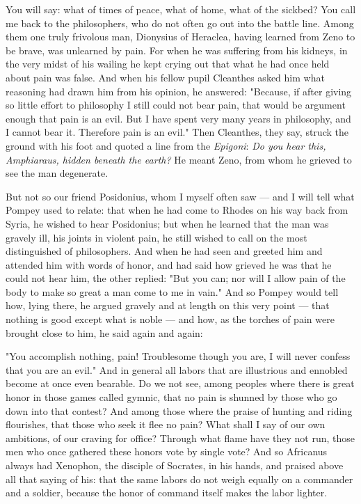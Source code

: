  You will say: what of times of peace, what of home, what of the sickbed? You call me back to the philosophers, who do not often go out into the battle line. Among them one truly frivolous man, Dionysius of Heraclea, having learned from Zeno to be brave, was unlearned by pain. For when he was suffering from his kidneys, in the very midst of his wailing he kept crying out that what he had once held about pain was false. And when his fellow pupil Cleanthes asked him what reasoning had drawn him from his opinion, he answered: "Because, if after giving so little effort to philosophy I still could not bear pain, that would be argument enough that pain is an evil. But I have spent very many years in philosophy, and I cannot bear it. Therefore pain is an evil." Then Cleanthes, they say, struck the ground with his foot and quoted a line from the \textit{Epigoni}: \textit{Do you hear this, Amphiaraus, hidden beneath the earth?} He meant Zeno, from whom he grieved to see the man degenerate.

 But not so our friend Posidonius, whom I myself often saw — and I will tell what Pompey used to relate: that when he had come to Rhodes on his way back from Syria, he wished to hear Posidonius; but when he learned that the man was gravely ill, his joints in violent pain, he still wished to call on the most distinguished of philosophers. And when he had seen and greeted him and attended him with words of honor, and had said how grieved he was that he could not hear him, the other replied: "But you can; nor will I allow pain of the body to make so great a man come to me in vain." And so Pompey would tell how, lying there, he argued gravely and at length on this very point — that nothing is good except what is noble — and how, as the torches of pain were brought close to him, he said again and again:

 "You accomplish nothing, pain! Troublesome though you are, I will never confess that you are an evil." And in general all labors that are illustrious and ennobled become at once even bearable. Do we not see, among peoples where there is great honor in those games called gymnic, that no pain is shunned by those who go down into that contest? And among those where the praise of hunting and riding flourishes, that those who seek it flee no pain? What shall I say of our own ambitions, of our craving for office? Through what flame have they not run, those men who once gathered these honors vote by single vote? And so Africanus always had Xenophon, the disciple of Socrates, in his hands, and praised above all that saying of his: that the same labors do not weigh equally on a commander and a soldier, because the honor of command itself makes the labor lighter.

